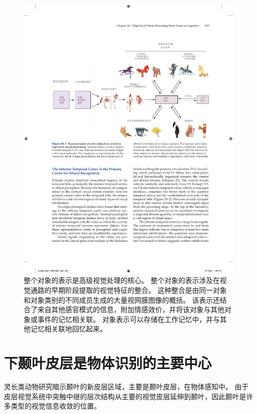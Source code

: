 \begin{figure}[htbp]
	\centering
	\includegraphics[width=1.0\linewidth]{chap24/fig_24_1}
	\caption{整个对象的表示是高级视觉处理的核心。
		整个对象的表示涉及在视觉通路的早期阶段提取的视觉特征的整合。
		这种整合是由同一对象和对象类别的不同成员生成的大量视网膜图像的概括。
		该表示还结合了来自其他感官模式的信息，附加情感效价，并将该对象与其他对象或事件的记忆相关联。
		对象表示可以存储在工作记忆中，并与其他记忆相关联地回忆起来。}
	\label{fig:24_1}
\end{figure}



\section{下颞叶皮层是物体识别的主要中心}

灵长类动物研究暗示颞叶的新皮层区域，主要是颞叶皮层，在物体感知中。
由于皮层视觉系统中突触中继的层次结构从主要的视觉皮层延伸到颞叶，因此颞叶是许多类型的视觉信息收敛的位置。



